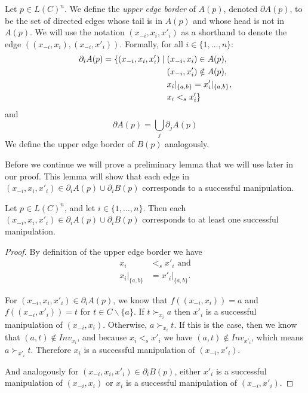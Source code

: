	\begin{definition}
		Let $p \in L(C)^n$. We define the \emph{upper edge border} of $A(p)$, denoted $\partial A(p)$, to be the set of directed edges whose tail is in $A(p)$ and whose head is not in $A(p)$. We will use the notation $(x_{-i}, x_i, x'_i)$ as a shorthand to denote the edge $((x_{-i},x_i), (x_{-i},x'_i))$. Formally, for all $i \in \{1, \ldots, n\}$:
			\begin{align*}
				\partial_i A(p) = \{ (x_{-i}, x_i, x'_i) \mid \hspace{1mm} & (x_{-i}, x_i) \in A(p), \\
				& (x_{-i}, x'_i) \notin A(p), \\
				& x_i|_{\{a,b\}} = x'_i|_{\{a,b\}}, \\
				& x_i <_s x'_i \}
			\end{align*}
		and
			\[
				\partial A(p) = \bigcup_j \partial_j A(p)
			\]
		We define the upper edge border of $B(p)$ analogously.
	\end{definition}

	Before we continue we will prove a preliminary lemma that we will use later in our proof. This lemma will show that each edge in $(x_{-i}, x_i, x'_i) \in \partial_i A(p) \cup \partial_i B(p)$ corresponds to a successful manipulation.

	\begin{lemma}
		\label{manipulation-per-edge-in-a}
		Let $p \in L(C)^n$, and let $i \in \{1, \ldots, n\}$. Then each $(x_{-i}, x_i, x'_i) \in \partial_i A(p) \cup \partial_i B(p)$ corresponds to at least one successful manipulation.
	\end{lemma}

	\begin{proof}
		By definition of the upper edge border we have
		\begin{align*}
			x_i &<_s x'_i \text{ and} \\
			x_i|_{\{a,b\}} &= x'_i|_{\{a,b\}}.
		\end{align*}

		For $(x_{-i}, x_i, x'_i) \in \partial_i A(p)$, we know that $f((x_{-i}, x_i)) = a$ and $f((x_{-i}, x'_i)) = t$ for $t \in C \backslash \{a\}$. If $t \succ_{x_i} a$ then $x'_i$ is a successful manipulation of $(x_{-i}, x_i)$. Otherwise, $a \succ_{x_i} t$. If this is the case, then we know that $(a, t) \notin Inv_{x_i}$, and because $x_i <_s x'_i$ we have $(a, t) \notin Inv_{x'_i}$, which means $a \succ_{x'_i} t$. Therefore $x_i$ is a successful manipulation of $(x_{-i}, x'_i)$.

		And analogously for $(x_{-i}, x_i, x'_i) \in \partial_i B(p)$, either $x'_i$ is a successful manipulation of $(x_{-i}, x_i)$ or $x_i$ is a successful manipulation of $(x_{-i}, x'_i)$.
	\end{proof}

